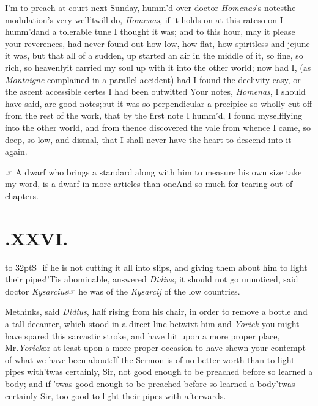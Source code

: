 \documentclass{article}
\begin{document}
I’m to preach at court next Sunday, 
humm’d over doctor \textit{Homenas}’s notes\tsk the
modulation’s very well\tsk ’twill do,\pb
\textit{Homenas}, if it holds on at this rate\tsk so on I
humm’d\tsk and a tolerable tune I thought it was; and to
this hour, may it please your reverences, had never found
out how low, how flat, how spiritless and jejune it was, but
that all of a sudden, up started an air in the middle of it,
so fine, so rich, so heavenly\tsk it carried my soul up
with it into the other world; now had I, (as
\textit{Montaigne} complained in a parallel accident)\tsk
had I found the declivity easy, or the ascent accessible\tsk
certes I had been outwitted\break
\tsk Your notes, \textit{Homenas}, I should have said, are
good notes;\tsh but it was so perpendicular a precipice\tsk
so wholly cut off from the rest of the work, that by
the\break
first note I humm’d, I found myself\break flying into the other
world, and from thence discovered the vale from whence\break
I came, so deep, so low, and dismal,\pb
that I shall never have
the heart to descend into it again.

☞ A dwarf who brings a standard\break
along with him to measure his own size\break
\tsk take my word, is a dwarf in more articles than
one\tsk And so much for tearing out of chapters.

\bigskip

\section{.\enspace XXVI.}

\lettrine{\hskip-3pt\hbox to 32pt{\Tsk S}}{\,\,} 
if he is not cutting it all into slips, and giving them
about him to light their pipes!\tsh ’Tis abominable,
answered \textit{Didius;} it should not go unnoticed, said
doctor \textit{Kysarcius}\tsh ☞  he was of the
\textit{Kysarcij} of the low countries.

Methinks, said \textit{Didius}, half rising\break
from his chair, in order to remove a\pb
bottle and a tall decanter, which stood in a direct line
betwixt him and \textit{Yorick}\break
\tsk you might have spared this sarcastic stroke, and have hit upon a more proper
place, Mr.\@ \textit{Yorick}\tsk or at least upon a more
proper occasion to have shewn your contempt of what we have
been about:\break If the Sermon is of no better worth than to
light pipes with\tsk ’twas certainly, Sir, not good enough
to be preached before so learned a body; and if ’twas good
enough to be preached before so learned a body\tsk ’twas
certainly Sir, too good to light their pipes with
afterwards.
\end{document}

